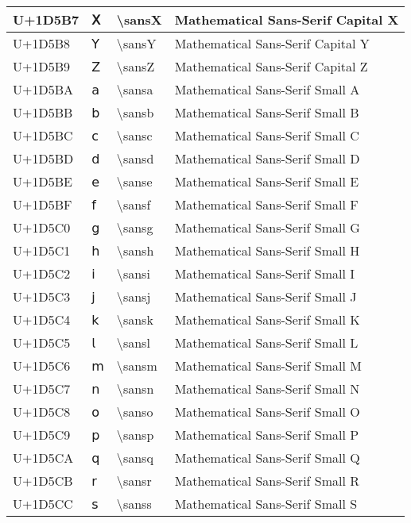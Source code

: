 \begin{table}[h]
\begin{tabulary}{\linewidth}{|L|L|L|L|}
\hline
U+1D5B7 & 𝖷 & {\textbackslash}sansX & Mathematical Sans-Serif Capital X \\
\hline
U+1D5B8 & 𝖸 & {\textbackslash}sansY & Mathematical Sans-Serif Capital Y \\
\hline
U+1D5B9 & 𝖹 & {\textbackslash}sansZ & Mathematical Sans-Serif Capital Z \\
\hline
U+1D5BA & 𝖺 & {\textbackslash}sansa & Mathematical Sans-Serif Small A \\
\hline
U+1D5BB & 𝖻 & {\textbackslash}sansb & Mathematical Sans-Serif Small B \\
\hline
U+1D5BC & 𝖼 & {\textbackslash}sansc & Mathematical Sans-Serif Small C \\
\hline
U+1D5BD & 𝖽 & {\textbackslash}sansd & Mathematical Sans-Serif Small D \\
\hline
U+1D5BE & 𝖾 & {\textbackslash}sanse & Mathematical Sans-Serif Small E \\
\hline
U+1D5BF & 𝖿 & {\textbackslash}sansf & Mathematical Sans-Serif Small F \\
\hline
U+1D5C0 & 𝗀 & {\textbackslash}sansg & Mathematical Sans-Serif Small G \\
\hline
U+1D5C1 & 𝗁 & {\textbackslash}sansh & Mathematical Sans-Serif Small H \\
\hline
U+1D5C2 & 𝗂 & {\textbackslash}sansi & Mathematical Sans-Serif Small I \\
\hline
U+1D5C3 & 𝗃 & {\textbackslash}sansj & Mathematical Sans-Serif Small J \\
\hline
U+1D5C4 & 𝗄 & {\textbackslash}sansk & Mathematical Sans-Serif Small K \\
\hline
U+1D5C5 & 𝗅 & {\textbackslash}sansl & Mathematical Sans-Serif Small L \\
\hline
U+1D5C6 & 𝗆 & {\textbackslash}sansm & Mathematical Sans-Serif Small M \\
\hline
U+1D5C7 & 𝗇 & {\textbackslash}sansn & Mathematical Sans-Serif Small N \\
\hline
U+1D5C8 & 𝗈 & {\textbackslash}sanso & Mathematical Sans-Serif Small O \\
\hline
U+1D5C9 & 𝗉 & {\textbackslash}sansp & Mathematical Sans-Serif Small P \\
\hline
U+1D5CA & 𝗊 & {\textbackslash}sansq & Mathematical Sans-Serif Small Q \\
\hline
U+1D5CB & 𝗋 & {\textbackslash}sansr & Mathematical Sans-Serif Small R \\
\hline
U+1D5CC & 𝗌 & {\textbackslash}sanss & Mathematical Sans-Serif Small S \\

\end{tabulary}
\end{table}
